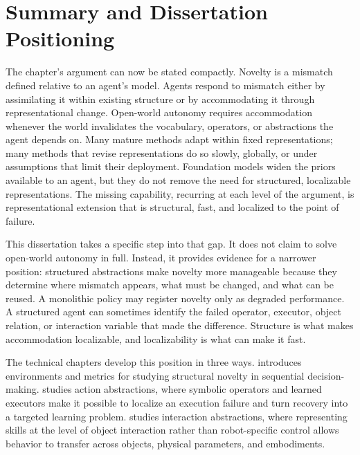 
\section{Summary and Dissertation Positioning}
\label{sec:synthesis_positioning}
\label{sec:positioning}
\label{sec:open_world_landscape}
\label{sec:related_work_positioning}
\label{sec:perspectives_integration}
\label{sec:ch2_summary}

The chapter's argument can now be stated compactly.
Novelty is a mismatch defined relative to an agent's model.
Agents respond to mismatch either by assimilating it within existing structure or by accommodating it through representational change.
Open-world autonomy requires accommodation whenever the world invalidates the vocabulary, operators, or abstractions the agent depends on.
Many mature methods adapt within fixed representations; many methods that revise representations do so slowly, globally, or under assumptions that limit their deployment.
Foundation models widen the priors available to an agent, but they do not remove the need for structured, localizable representations.
The missing capability, recurring at each level of the argument, is representational extension that is structural, fast, and localized to the point of failure.

This dissertation takes a specific step into that gap.
It does not claim to solve open-world autonomy in full.
Instead, it provides evidence for a narrower position: structured abstractions make novelty more manageable because they determine where mismatch appears, what must be changed, and what can be reused.
A monolithic policy may register novelty only as degraded performance.
A structured agent can sometimes identify the failed operator, executor, object relation, or interaction variable that made the difference.
Structure is what makes accommodation localizable, and localizability is what can make it fast.

The technical chapters develop this position in three ways.
 introduces environments and metrics for studying structural novelty in sequential decision-making.
 studies action abstractions, where symbolic operators and learned executors make it possible to localize an execution failure and turn recovery into a targeted learning problem.
 studies interaction abstractions, where representing skills at the level of object interaction rather than robot-specific control allows behavior to transfer across objects, physical parameters, and embodiments.

